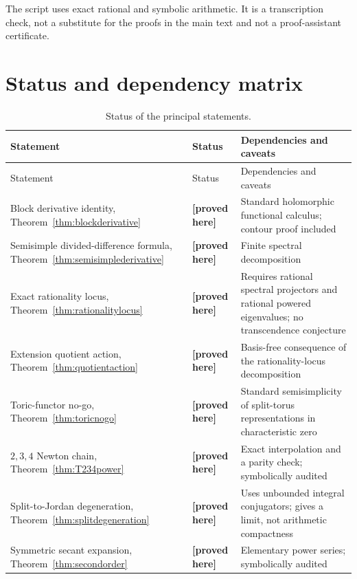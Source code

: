 \documentclass[11pt,oneside]{article}
\theoremstyle{definition}
\theoremstyle{remark}
\newcommand{\paperproof}{\textcolor{proofgreen}{\textbf{[proved here]}}}
\begin{document}
The script uses exact rational and symbolic arithmetic.  It is a transcription check, not a
substitute for the proofs in the main text and not a proof-assistant certificate.

\section{Status and dependency matrix}
\label{app:status}

\begin{longtable}{>{\raggedright\arraybackslash}p{}
                  >{\raggedright\arraybackslash}p{}
                  >{\raggedright\arraybackslash}p{}}
\caption{Status of the principal statements.}\label{tab:status}\\
\toprule
Statement & Status & Dependencies and caveats\\
\midrule
\endfirsthead
\toprule
Statement & Status & Dependencies and caveats\\
\midrule
\endhead
Block derivative identity, Theorem~\ref{thm:blockderivative} & \paperproof{} & Standard
holomorphic functional calculus; contour proof included\\
\addlinespace
Semisimple divided-difference formula, Theorem~\ref{thm:semisimplederivative} & \paperproof{} &
Finite spectral decomposition\\
\addlinespace
Exact rationality locus, Theorem~\ref{thm:rationalitylocus} & \paperproof{} & Requires rational
spectral projectors and rational powered eigenvalues; no transcendence conjecture\\
\addlinespace
Extension quotient action, Theorem~\ref{thm:quotientaction} & \paperproof{} & Basis-free
consequence of the rationality-locus decomposition\\
\addlinespace
Toric-functor no-go, Theorem~\ref{thm:toricnogo} & \paperproof{} & Standard semisimplicity of
split-torus representations in characteristic zero\\
\addlinespace
$2,3,4$ Newton chain, Theorem~\ref{thm:T234power} & \paperproof{} & Exact interpolation and a
parity check; symbolically audited\\
\addlinespace
Split-to-Jordan degeneration, Theorem~\ref{thm:splitdegeneration} & \paperproof{} & Uses
unbounded integral conjugators; gives a limit, not arithmetic compactness\\
\addlinespace
Symmetric secant expansion, Theorem~\ref{thm:secondorder} & \paperproof{} & Elementary power
series; symbolically audited\\

\end{longtable}
\end{document}
